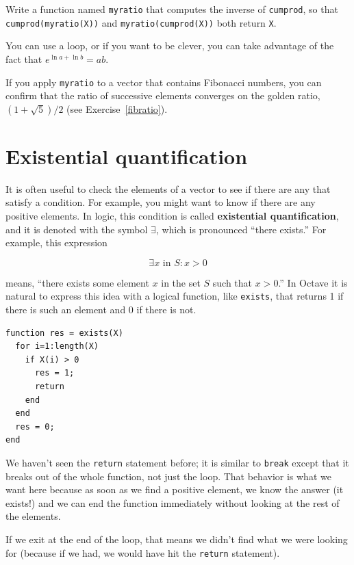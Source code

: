 \documentclass{book}
\begin{document}
\begin{ex}
Write a function named {\tt myratio} that computes the
inverse of {\tt cumprod}, so that {\tt cumprod(myratio(X))} and
{\tt myratio(cumprod(X))} both
return {\tt X}.

You can use a loop, or if you want to be clever, you can take
advantage of the fact that $e^{\ln a + \ln b} = a b$.

If you apply {\tt myratio} to a vector that contains Fibonacci
numbers, you can confirm that the ratio of successive elements
converges on the golden ratio, $(1+\sqrt{5})/2$ (see
Exercise~\ref{fibratio}).
\end{ex}



\section{Existential quantification}

It is often useful to check the elements of a vector to see if there
are any that satisfy a condition. For example, you might want to
know if there are any positive elements. In logic, this condition
is called {\bf existential quantification}, and it is denoted with
the symbol $\exists$, which is pronounced ``there exists.'' For example,
this expression

\[ \exists x \mbox{~in~} S: x>0 \]

means, ``there exists some element $x$ in the set $S$ such that
$x>0$.'' In Octave it is natural to express this idea with a logical
function, like {\tt exists}, that returns 1 if there is such an
element and 0 if there is not.

\begin{verbatim}
function res = exists(X)
  for i=1:length(X)
    if X(i) > 0
      res = 1;
      return
    end
  end
  res = 0;
end
\end{verbatim}

We haven't seen the {\tt return} statement before; it is similar
to {\tt break} except that it breaks out of the whole function, not
just the loop. That behavior is what we want here because as soon
as we find a positive element, we know the answer (it exists!) and
we can end the function immediately without looking at the rest
of the elements.

If we exit at the end of the loop, that means we didn't find what
we were looking for (because if we had, we would have hit the
{\tt return} statement).
\end{document}
